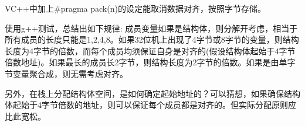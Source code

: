 VC++中加上\#pragma pack(n)的设定能取消数据对齐，按照字节存储。

使用g++测试，总结出如下规律:
    成员变量如果是结构体，则分解开考虑，相当于所有成员的长度只能是1,2,4,8。如果32位机上出现了4字节或8字节的变量，则结构长度为4字节的倍数，而每个成员均须保证自身是对齐的(假设结构体起始于4字节倍数地址)。如果最长的成员长2字节，则结构长度为2字节的倍数。如果是由单字节变量聚合成，则无需考虑对齐。


另外，在栈上分配结构体空间，是如何确定起始地址的？可以猜想，如果确保结构体起始于4字节倍数的地址，则可以保证每个成员都是对齐的。但实际分配原则应比此宽松。




